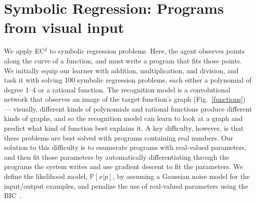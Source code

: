 \documentclass{article}
\newcommand{\system}{\textsc{EC$^2$} }
\newcommand{\probability}{\mathds{P}} %
\begin{document}
\section{Symbolic Regression: Programs from visual input}\label{regressionSection}
We apply \system
to symbolic regression problems.  Here, the
agent observes points along the curve of a function, and must write a
program that fits those points.  We initially equip our learner with
addition, multiplication, and division, and task it with solving
100 symbolic regression problems, each either a polynomial of degree
1--4 or a rational function.  The recognition model is a
convolutional network that observes an image of the target function's
graph (Fig.~\ref{functions}) --- visually, different kinds of
polynomials and rational functions produce different kinds of graphs,
and so the recognition model can learn to look at a graph and predict
what kind of function best explains it.  A key difficulty, however, is
that these problems are best solved with programs containing real
numbers.  Our solution to this difficulty is to enumerate
 programs with real-valued parameters, and then fit those
parameters by automatically differentiating through the programs the
system writes and use gradient descent to fit the parameters.
We define the likelihood model, $\probability[x|p]$, by assuming a Gaussian noise model for the input/output examples,
and penalize the use of real-valued parameters using the BIC~\cite{Bishop:2006:PRM:1162264}.
\end{document}
